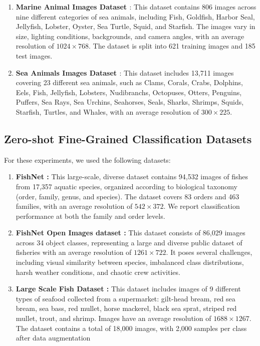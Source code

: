 \begin{enumerate}
    \item \textbf{Marine Animal Images Dataset \cite{marine_animal}}: This dataset contains 806 images across nine different categories of sea animals, including Fish, Goldfish, Harbor Seal, Jellyfish, Lobster, Oyster, Sea Turtle, Squid, and Starfish. 
The images vary in size, lighting conditions, backgrounds, and camera angles, with an average resolution of $1024 \times 768$.
The dataset is split into 621 training images and 185 test images.

\item \textbf{Sea Animals Images Dataset \cite{sea_animal}}: This dataset includes 13,711 images covering 23 different sea animals, such as Clams, Corals, Crabs, Dolphins, Eels, Fish, Jellyfish, Lobsters, Nudibranchs, Octopuses, Otters, Penguins, Puffers, Sea Rays, Sea Urchins, Seahorses, Seals, Sharks, Shrimps, Squids, Starfish, Turtles, and Whales, with an average resolution of $300 \times 225$.
\end{enumerate}



\subsection{Zero-shot Fine-Grained Classification Datasets}
For these experiments, we used the following datasets:

\begin{enumerate}
    \item \textbf{FishNet \cite{khan2023fishnet}:} This large-scale, diverse dataset contains 94,532 images of fishes from 17,357 aquatic species, organized according to biological taxonomy (order, family, genus, and species). 
The dataset covers 83 orders and 463 families, with an average resolution of $542 \times 372$. 
We report classification performance at both the family and order levels.

\item \textbf{FishNet Open Images dataset \cite{kay2021fishnet}:} This dataset consists of 86,029 images across 34 object classes, representing a large and diverse public dataset of fisheries with an average resolution of $1261 \times 722$.
It poses several challenges, including visual similarity between species, imbalanced class distributions, harsh weather conditions, and chaotic crew activities.

\item \textbf{Large Scale Fish Dataset \cite{ulucan2020large}:} This dataset includes images of 9 different types of seafood collected from a supermarket: gilt-head bream, red sea bream, sea bass, red mullet, horse mackerel, black sea sprat, striped red mullet, trout, and shrimp. 
Images have an average resolution of $1688 \times 1267$. 
The dataset contains a total of 18,000 images, with 2,000 samples per class after data augmentation

\end{enumerate}



